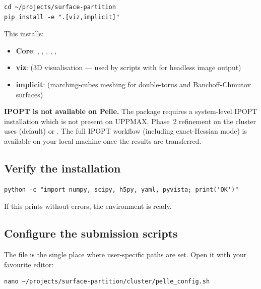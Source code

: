 \documentclass[11pt,a4paper]{article}
\begin{document}
\begin{lstlisting}[style=shell]
cd ~/projects/surface-partition
pip install -e ".[viz,implicit]"
\end{lstlisting}

This installs:
\begin{itemize}[leftmargin=1.5em]
  \item \textbf{Core}: , , , ,
        , 
  \item \textbf{viz}:  (3D visualisation --- used by scripts with
         for headless image output)
  \item \textbf{implicit}:  (marching-cubes meshing for
        double-torus and Banchoff-Chmutov surfaces)
\end{itemize}

\begin{warnbox}
\textbf{IPOPT is not available on Pelle.}
The  package requires a system-level IPOPT installation which is
not present on UPPMAX.  Phase~2 refinement on the cluster uses
 (default) or .
The full IPOPT workflow (including exact-Hessian mode) is available on your
local machine once the results are transferred.
\end{warnbox}

\subsection{Verify the installation}

\begin{lstlisting}[style=shell]
python -c "import numpy, scipy, h5py, yaml, pyvista; print('OK')"
\end{lstlisting}

If this prints  without errors, the environment is ready.

\subsection{Configure the submission scripts}
\label{sec:config}

The file  is the single place where
user-specific paths are set.  Open it with your favourite editor:

\begin{lstlisting}[style=shell]
nano ~/projects/surface-partition/cluster/pelle_config.sh
\end{lstlisting}
\end{document}
